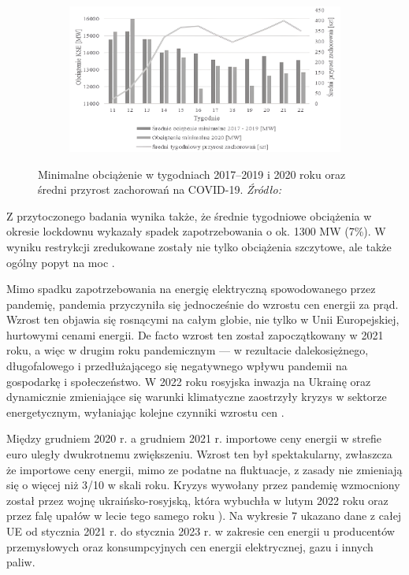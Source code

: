 \documentclass[polish, twoside, 12pt, a4paper]{article}
\theoremstyle{definition}
\theoremstyle{plain}
\theoremstyle{remark}
\begin{document}
\begin{figure}[hbt]
  \centering

  \begin{subfigure}[t]{0.45\textwidth}
    \hspace{-1.5cm}
    \includegraphics[width=1.4\textwidth]{./out_figures/figure_8}
  \end{subfigure}

  \captionsetup{margin=10pt,font=small,labelfont=bf,width=.8\textwidth}

  \caption[Minimalne obciążenie w tygodniach 2017--2019 i 2020 roku oraz średni przyrost zachorowań na COVID-19]{Minimalne obciążenie w tygodniach 2017--2019 i 2020 roku oraz średni przyrost zachorowań na COVID-19. \textit{Źródło:} \cite{stahl2021}}\label{fig:x8}
\end{figure}

Z przytoczonego badania wynika także, że średnie tygodniowe obciążenia w okresie lockdownu wykazały spadek zapotrzebowania o ok. 1300 MW (7\%). W wyniku restrykcji zredukowane zostały nie tylko obciążenia szczytowe, ale także ogólny popyt na moc \citep{stahl2021}.

Mimo spadku zapotrzebowania na energię elektryczną spowodowanego przez pandemię, pandemia przyczyniła się jednocześnie do wzrostu cen energii za prąd. Wzrost ten objawia się rosnącymi na całym globie, nie tylko w Unii Europejskiej, hurtowymi cenami energii. De facto wzrost ten został zapoczątkowany w 2021 roku, a więc w drugim roku pandemicznym --- w rezultacie dalekosiężnego, długofalowego i przedłużającego się negatywnego wpływu pandemii na gospodarkę i społeczeństwo. W 2022 roku rosyjska inwazja na Ukrainę oraz dynamicznie zmieniające się warunki klimatyczne zaostrzyły kryzys w sektorze energetycznym, wyłaniając kolejne czynniki wzrostu cen \citep{council2023}. 

Między grudniem 2020 r. a grudniem 2021 r. importowe ceny energii w strefie euro uległy dwukrotnemu zwiększeniu. Wzrost ten był spektakularny, zwłaszcza że importowe ceny energii, mimo ze podatne na fluktuacje, z zasady nie zmieniają się o więcej niż 3/10 w skali roku. Kryzys wywołany przez pandemię wzmocniony został przez wojnę ukraińsko-rosyjską, która wybuchła w lutym 2022 roku oraz przez falę upałów w lecie tego samego roku \citep{council2023}). Na wykresie 7 ukazano dane z całej UE od stycznia 2021 r. do stycznia 2023 r. w zakresie cen energii u producentów przemysłowych oraz konsumpcyjnych cen energii elektrycznej, gazu i innych paliw.
\end{document}
